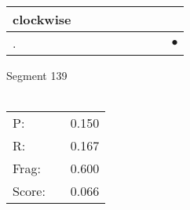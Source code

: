\documentclass[landscape]{article}
\newcommand{\ssp}{\hspace{2pt}}
\newcommand{\mex}{\cellcolor{g}$\bullet$}
\begin{document}
\begin{tabular}{|l|p{10pt}|p{10pt}|p{10pt}|p{10pt}|p{10pt}|p{10pt}|p{10pt}|p{10pt}|}
\hline
\ssp clockwise \ssp&\hspace{2pt}&\hspace{2pt}&\hspace{2pt}&\hspace{2pt}&\hspace{2pt}&\hspace{2pt}&\hspace{2pt}&\hspace{2pt}\\
\hline
\ssp \cellcolor{ref7}. \ssp&\hspace{2pt}&\hspace{2pt}&\hspace{2pt}&\hspace{2pt}&\hspace{2pt}&\hspace{2pt}&\hspace{2pt}&\hspace{2pt}\mex\\
\hline
\end{tabular}

\vspace{6pt}
\noindent Segment 139\\\\
\noindent\begin{tabular}{lm{12pt}r}
\hline
P:&&0.150\\
R:&&0.167\\
Frag:&&0.600\\
Score:&&0.066\\
\end{tabular}

\newpage
\end{document}
